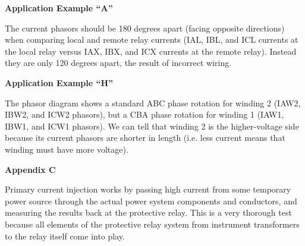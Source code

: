 
 






\noindent
{\bf Application Example ``A''}

The current phasors should be 180 degrees apart (facing opposite directions) when comparing local and remote relay currents (IAL, IBL, and ICL currents at the local relay versus IAX, IBX, and ICX currents at the remote relay).  Instead they are only 120 degrees apart, the result of incorrect wiring.

\vskip 10pt

\noindent
{\bf Application Example ``H''}

The phasor diagram shows a standard ABC phase rotation for winding 2 (IAW2, IBW2, and ICW2 phasors), but a CBA phase rotation for winding 1 (IAW1, IBW1, and ICW1 phasors).  We can tell that winding 2 is the higher-voltage side because its current phasors are shorter in length (i.e. less current means that winding must have more voltage). 

\vskip 10pt

\noindent
{\bf Appendix C}

Primary current injection works by passing high current from some temporary power source through the actual power system components and conductors, and measuring the results back at the protective relay.  This is a very thorough test because all elements of the protective relay system from instrument transformers to the relay itself come into play.







